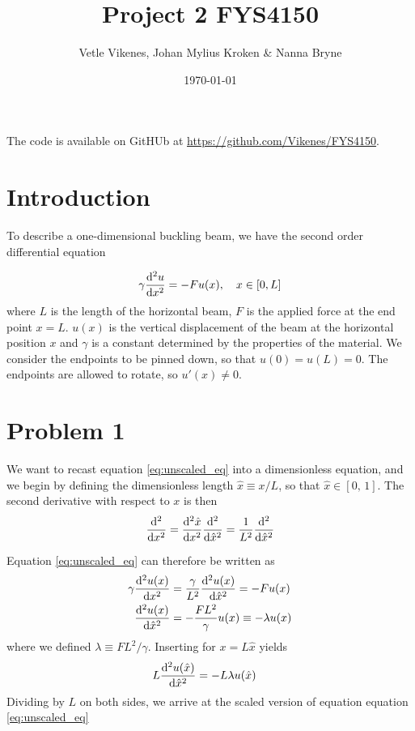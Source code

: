 \documentclass[english,notitlepage,nofootinbib]{revtex4-1}  %
\begin{document}
\title{Project 2 FYS4150}      %
\author{Vetle Vikenes, Johan Mylius Kroken \& Nanna Bryne}          %
\date{\today}                             %
\noaffiliation                            %


\maketitle 
    
The code is available on GitHUb at \url{https://github.com/Vikenes/FYS4150}.
    

\section*{Introduction}

To describe a one-dimensional buckling beam, we have the second order differential equation 

\begin{align}\label{eq:unscaled_eq}
    \gamma \dv[2]{u}{x} = -F u(x), \quad x\in [0,L]
\end{align}
where $L$ is the length of the horizontal beam, $F$ is the applied force at the end point $x=L$. $u(x)$ is the vertical displacement of the beam at the horizontal position $x$ and $\gamma$ is a constant determined by the properties of the material. We consider the endpoints to be pinned down, so that $u(0)=u(L)=0$. The endpoints are allowed to rotate, so $u'(x)\neq0$.

\section*{Problem 1}

We want to recast equation \eqref{eq:unscaled_eq} into a dimensionless equation, and we begin by defining the dimensionless length $\hat{x}\equiv x/L$, so that $\hat{x}\in[0,\,1]$. The second derivative with respect to $x$ is then 
\begin{align*}
    \dv[2]{x} = \dv[2]{\hat{x}}{x}\dv[2]{\hat{x}}=\frac{1}{L^2} \dv[2]{\hat{x}}
\end{align*}  

Equation \eqref{eq:unscaled_eq} can therefore be written as 
\begin{align*}
    \gamma \dv[2]{u(x)}{x} &= \frac{\gamma}{L^2}\dv[2]{u(x)}{\hat{x}} = -F u(x) \\ 
    \dv[2]{u(x)}{\hat{x}} &= - \frac{FL^2}{\gamma} u(x) \equiv -\lambda u(x)
\end{align*}
where we defined $\lambda\equiv F L ^2 / \gamma$. Inserting for $x=L\hat{x}$ yields 
\begin{align*}
    L \dv[2]{u(\hat{x})}{\hat{x}} &= -L \lambda u(\hat{x}) 
\end{align*}
Dividing by $L$ on both sides, we arrive at the scaled version of equation equation \eqref{eq:unscaled_eq}
\end{document}
